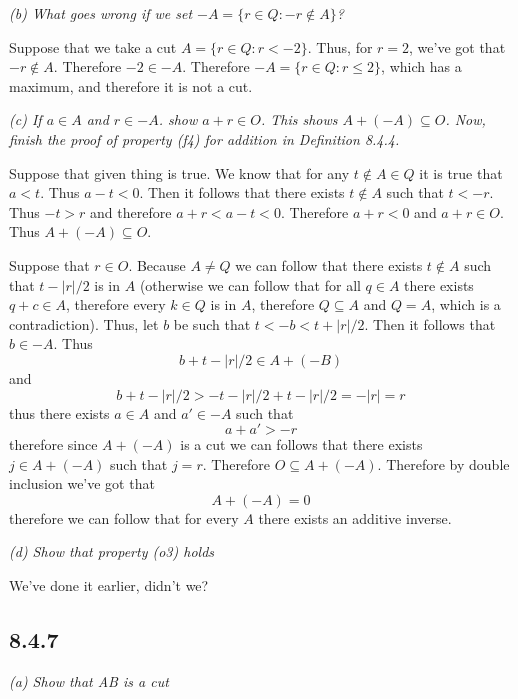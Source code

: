 \documentclass[11pt,oneside,titlepage]{book}
\begin{document}
\textit{(b) What goes wrong if we set $-A = \{r \in Q: -r \notin A\}$?}

Suppose that we take a cut $A = \{r \in Q: r < -2\}$. Thus, for $r = 2$, we've got
that $-r \notin A$. Therefore $-2 \in -A$. Therefore $-A = \{r \in Q: r \leq 2\}$, which
has a maximum, and therefore it is not a cut.

\textit{(c) If $a \in A$ and $r \in -A$. show $a + r \in O$. This shows $A + (-A) \subseteq O$.
  Now, finish the proof of property (f4) for addition in Definition 8.4.4.}

Suppose that given thing is true. We know that for any $t \notin A \in Q$ it is true that
$a < t$. Thus $a - t < 0$. Then it follows that there exists $t \notin A$ such that
$t < -r$. Thus $-t > r$ and therefore $ a + r < a - t < 0$. Therefore $a + r < 0$ and
$a + r \in O$. Thus $A + (-A) \subseteq O$.

Suppose that $r \in O$. Because $A \neq Q$ we can follow that there exists $t \notin A$ such
that $t - |r|/2$ is in $A$ (otherwise we can follow that for all $q \in A$ there exists
$q + c \in A$, therefore every $k \in Q$ is in $A$, therefore $Q \subseteq A$ and $Q = A$,
which is a contradiction). Thus, let $b$ be  such that  $t < -b < t + |r|/2$. Then
it follows that $b \in -A$. Thus
$$b + t - |r|/2 \in A + (-B)$$
and
$$b + t - |r|/2 > -t - |r|/2 + t - |r|/2 = -|r| = r$$
thus there exists $a \in A$ and $a' \in -A$ such that
$$a + a' > -r$$
therefore since $A + (-A)$ is a cut we can follows that  there exists $j \in A + (-A)$ such
that $j = r$. Therefore $O \subseteq A + (-A)$. Therefore by double inclusion we've got that
$$A + (-A) = 0$$
therefore we can follow that for every $A$ there exists an additive inverse.

\textit{(d) Show that property (o3) holds}

We've done it earlier, didn't we?

\subsection{8.4.7}

\textit{(a) Show that AB is a cut}
\end{document}
